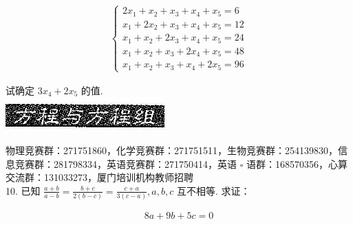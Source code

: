 \documentclass[10pt]{article}
\begin{document}
\begin{align*}
\left\{\begin{array}{l}
2 x_{1}+x_{2}+x_{3}+x_{4}+x_{5}=6 \\
x_{1}+2 x_{2}+x_{3}+x_{4}+x_{5}=12 \\
x_{1}+x_{2}+2 x_{3}+x_{4}+x_{5}=24 \\
x_{1}+x_{2}+x_{3}+2 x_{4}+x_{5}=48 \\
x_{1}+x_{2}+x_{3}+x_{4}+2 x_{5}=96
\end{array}\right.
\end{align*}

试确定 $3 x_{4}+2 x_{5}$ 的值.\\
\includegraphics[max width=\textwidth, center]{2024_10_30_26b590fd1106d28139f0g-030}

物理竞赛群：271751860，化学竞赛群：271751511，生物竞赛群：254139830，信息竞赛群：281798334，英语竞赛群：271750414，英语 $\square$ 语群：168570356，心算交流群：131033273，厦门培训机构教师招聘\\
10. 已知 $\frac{a+b}{a-b}=\frac{b+c}{2(b-c)}=\frac{c+a}{3(c-a)}, a, b, c$ 互不相等. 求证：

\begin{align*}
8 a+9 b+5 c=0
\end{align*}
\end{document}
